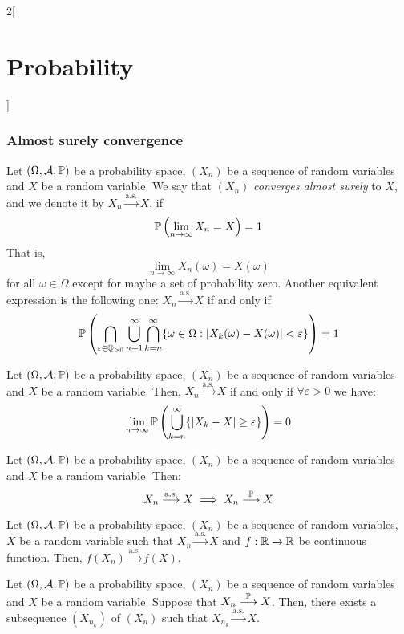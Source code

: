 \documentclass[../../../main_math.tex]{subfiles}
\begin{document}
\begin{multicols}{2}[\section{Probability}]
  \subsubsection{Almost surely convergence}
  \begin{definition}\label{P:as-conv}
    Let $(\Omega,\mathcal{A},\mathbb{P})$ be a probability space, $(X_n)$ be a sequence of random variables and $X$ be a random variable. We say that $(X_n)$ \emph{converges almost surely} to $X$, and we denote it by $X_n\overset{\text{a.s.}}{\longrightarrow} X$, if $$\mathbb{P}\left(\lim_{n\to\infty}X_n=X\right)=1$$ That is, $$\lim_{n\to\infty}X_n(\omega)=X(\omega)$$ for all $\omega\in\Omega$ except for maybe a set of probability zero. Another equivalent expression is the following one: $X_n\overset{\text{a.s.}}{\longrightarrow} X$ if and only if $$\mathbb{P}\left(\bigcap_{\varepsilon\in\mathbb{Q}_{>0}}\bigcup_{n=1}^\infty\bigcap_{k=n}^\infty\{\omega\in\Omega:|X_k(\omega)-X(\omega)|<\varepsilon\}\right)=1$$
  \end{definition}
  \begin{proposition}
    Let $(\Omega,\mathcal{A},\mathbb{P})$ be a probability space, $(X_n)$ be a sequence of random variables and $X$ be a random variable. Then, $X_n\overset{\text{a.s.}}{\longrightarrow} X$ if and only if $\forall \varepsilon>0$ we have: $$\lim_{n\to\infty}\mathbb{P}\left(\bigcup_{k=n}^\infty\{|X_k-X|\geq\varepsilon\}\right)=0$$
  \end{proposition}
  \begin{proposition}
    Let $(\Omega,\mathcal{A},\mathbb{P})$ be a probability space, $(X_n)$ be a sequence of random variables and $X$ be a random variable. Then:
    $$X_n\overset{\text{a.s.}}{\longrightarrow} X\implies X_n\overset{\mathbb{P}}{\longrightarrow} X$$
  \end{proposition}
  \begin{proposition}
    Let $(\Omega,\mathcal{A},\mathbb{P})$ be a probability space, $(X_n)$ be a sequence of random variables, $X$ be a random variable such that $X_n\overset{\text{a.s.}}{\longrightarrow} X$ and $f:\mathbb{R}\rightarrow\mathbb{R}$ be continuous function. Then, $f(X_n)\overset{\text{a.s.}}{\longrightarrow} f(X)$.
  \end{proposition}
  \begin{proposition}
    Let $(\Omega,\mathcal{A},\mathbb{P})$ be a probability space, $(X_n)$ be a sequence of random variables and $X$ be a random variable. Suppose that $X_n\overset{\mathbb{P}}{\longrightarrow} X$. Then, there exists a subsequence $(X_{n_k})$ of $(X_n)$ such that $X_{n_k}\overset{\text{a.s.}}{\longrightarrow} X$.

\end{proposition}
\end{multicols}
\end{document}
